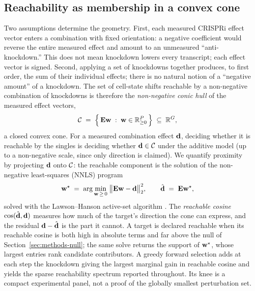 \subsection{Reachability as membership in a convex cone}
\label{sec:methods-cone}
Two assumptions determine the geometry. First, each measured CRISPRi effect vector enters a
combination with fixed orientation: a negative coefficient would reverse the entire measured
effect and amount to an unmeasured ``anti-knockdown.'' This does not mean knockdown lowers
every transcript; each effect vector is signed. Second, applying a set of knockdowns together
produces, to first
order, the sum of their individual effects; there is no natural notion of a
``negative amount'' of a knockdown. The set of cell-state shifts reachable by a non-negative
combination of knockdowns is therefore the \emph{non-negative conic hull} of the measured
effect vectors,
\begin{equation}
\mathcal{C} \;=\; \Bigl\{\, \mathbf{E}\mathbf{w} \;:\; \mathbf{w} \in \mathbb{R}_{\geq 0}^{P} \,\Bigr\}
\;\subseteq\; \mathbb{R}^{G},
\label{eq:cone}
\end{equation}
a closed convex cone. For a measured combination effect $\mathbf{d}$, deciding whether it is reachable by the singles is deciding whether
$\mathbf{d}\in\mathcal{C}$ under the additive model (up to a non-negative scale, since only direction is
claimed). We quantify
proximity by projecting $\mathbf{d}$ onto $\mathcal{C}$: the reachable component is the solution of the
non-negative least-squares (NNLS) program
\begin{equation}
\mathbf{w}^{\star} \;=\; \arg\min_{\mathbf{w} \,\geq\, 0}\; \bigl\lVert \mathbf{E}\mathbf{w} - \mathbf{d} \bigr\rVert_2^{2},
\qquad
\hat{\mathbf{d}} \;=\; \mathbf{E}\mathbf{w}^{\star},
\label{eq:nnls}
\end{equation}
solved with the Lawson--Hanson active-set algorithm \citep{LawsonHanson1974}. The
\emph{reachable cosine} $\cos(\hat{\mathbf{d}},\mathbf{d})$ measures how much of the target's direction
the cone can express, and the residual $\mathbf{d}-\hat{\mathbf{d}}$ is the part it cannot. A target is
declared reachable when its reachable cosine is both high in absolute terms and far above the
null of Section~\ref{sec:methods-null}; the same solve returns the support of $\mathbf{w}^{\star}$,
whose largest entries rank candidate contributors. A greedy forward selection adds at each
step the knockdown giving the largest marginal gain in reachable cosine and yields the sparse
reachability spectrum reported throughout. Its knee is a compact experimental panel, not a
proof of the globally smallest perturbation set.


